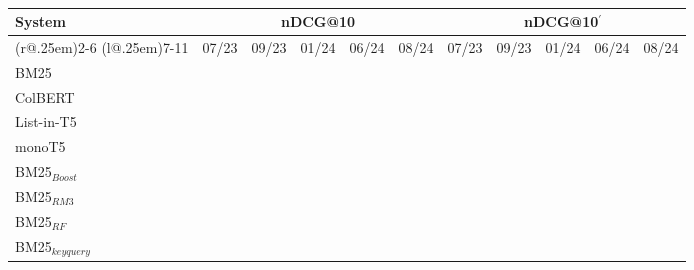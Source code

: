 \begin{table}[t]
\small
\centering
\renewcommand{\tabcolsep}{3.2pt}
\caption{ }
\label{tab:table-results}

\begin{tabular}{@{}l@{}cccccccccc@{}}
    \toprule
    \bfseries System & \multicolumn{5}{c}{\bfseries nDCG@10} & \multicolumn{5}{c}{\bfseries nDCG@10$^{'}$}\\
    \cmidrule(r@{.25em}){2-6}
    \cmidrule(l@{.25em}){7-11}
    
    & 07/23 & 09/23 & 01/24 & 06/24 & 08/24 & 07/23 & 09/23 & 01/24 & 06/24 & 08/24\\
    
    \midrule

    BM25 \\
    ColBERT\\
    List-in-T5\\
    monoT5\\
    
    \midrule
    
    BM25$_{Boost}$\\
    BM25$_{RM3}$\\
    BM25$_{RF}$\\
    BM25$_{keyquery}$\\

\bottomrule
\end{tabular}
\end{table}
